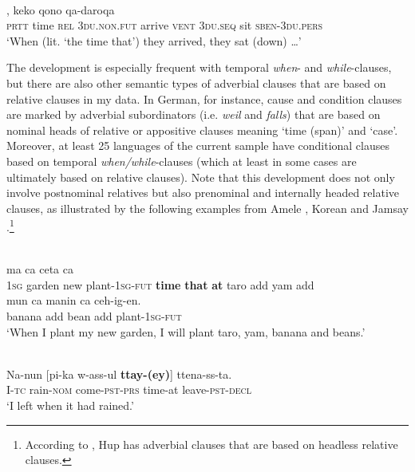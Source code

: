 \documentclass[output=paper]{langsci/langscibook}
\begin{document}
\ea\label{ex:diessel:11}
\\
,  keko  qono  qa-daroqa\\
        \textsc{prtt}   time  \textsc{rel}   3\textsc{du.non.fut}  arrive  \textsc{vent}  \textsc{3du.seq}  sit  \textsc{sben-3du.pers}\\
\glt   `When (lit. `the time that’) they arrived, they sat (down) …'
\z

The development is especially frequent with temporal \textit{when}- and \textit{while}-clauses, but there are also other semantic types of adverbial clauses that are based on relative clauses in my data. In German, for instance, cause and condition clauses are marked by adverbial subordinators (i.e. \textit{weil} and \textit{falls}) that are based on nominal heads of relative or appositive clauses meaning ‘time (span)’ and ‘case’. Moreover, at least 25 languages of the current sample have conditional clauses based on temporal \textit{when/while}-clauses (which at least in some cases are ultimately based on relative clauses). Note that this development does not only involve postnominal relatives but also prenominal and internally headed relative clauses, as illustrated by the following examples from Amele , Korean  and Jamsay .\footnote{According to \citet{Epps2009_RC}, Hup has adverbial clauses that are based on headless relative clauses.} 

\ea\label{ex:diessel:12}
\\
   ma   ca  ceta  ca\\
        1\textsc{sg}   garden   new   plant-1\textsc{sg-fut}   \textbf{time}   \textbf{that}    \textbf{at}   taro   add  yam  add  \\
\gll   mun    ca    manin    ca  ceh-ig-en.\\
       banana   add bean    add  plant-\textsc{1sg-fut}\\
\glt `When I plant my new garden, I will plant taro, yam, banana and beans.'
\z

\ea\label{ex:diessel:13}
\\
\gll   Na-nun  [pi-ka  w-ass-ul   \textbf{ttay-(ey)}]    ttena-ss-ta.\\
       I-\textsc{tc}  rain-\textsc{nom}  come-\textsc{pst-prs}  time-at     leave-\textsc{pst-decl}\\
\glt   `I left when it had rained.' 
\z
\end{document}
